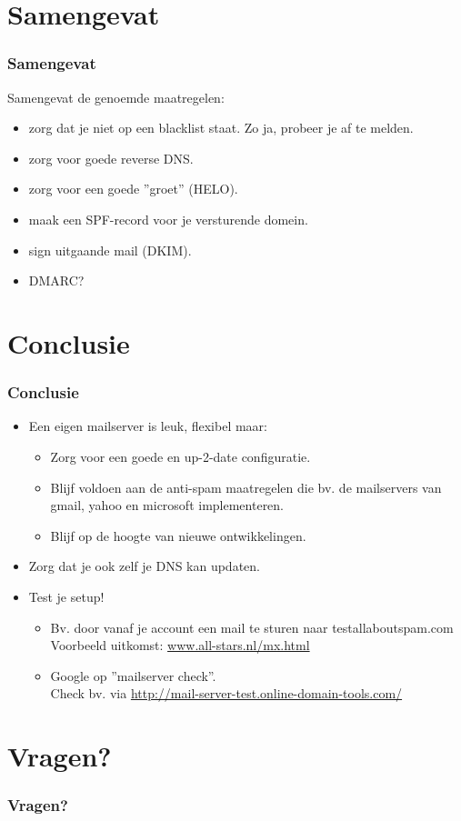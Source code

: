 \section{Samengevat}
\begin{frame}
    \frametitle{Samengevat}
Samengevat de genoemde maatregelen:
\begin{itemize}
\pause
\item zorg dat je niet op een blacklist staat. Zo ja, probeer je af te melden.
\pause
\item zorg voor goede reverse DNS.
\pause
\item zorg voor een goede ''groet'' (HELO).
\pause
\item maak een SPF-record voor je versturende domein.
\pause
\item sign uitgaande mail (DKIM).
\pause
\item DMARC?
\end{itemize}
\end{frame}

\section{Conclusie}
\begin{frame}
    \frametitle{Conclusie}
\begin{itemize}
\pause
\item Een eigen mailserver is leuk, flexibel maar:\\
\pause
	\begin{itemize}
	\item Zorg voor een goede en up-2-date configuratie.\\
	\pause
	\item Blijf voldoen aan de anti-spam maatregelen die bv. de mailservers van gmail, yahoo en microsoft implementeren. 
	\pause
	\item Blijf op de hoogte van nieuwe ontwikkelingen.
	\end{itemize}
\pause
\item Zorg dat je ook zelf je DNS kan updaten.
\pause
\item Test je setup!
	\begin{itemize}
    \pause
	\item Bv. door vanaf je account een mail te sturen naar test{\myat}allaboutspam.com\\
	Voorbeeld uitkomst: \url{www.all-stars.nl/mx.html}\\
    \pause
	\item Google op ''mailserver check''.\\
		  Check bv. via \url{http://mail-server-test.online-domain-tools.com/}
	\end{itemize}
\end{itemize}
\end{frame}

\section{Vragen?}
\begin{frame}
    \frametitle{Vragen?}
\end{frame}
